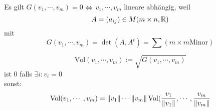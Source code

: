 \begin{Bem}
  Es gilt $G(v_1,\cdots,v_m)=0$ $\Leftrightarrow$ $v_1,\cdots,v_m$ lineare abhängig, weil
  \[A=(a_{ij})\in M(m\times n,\mathbb{R})\]
  mit
  \[G(v_1,\cdots,v_m)=\det (A,A^t)=\sum(m\times m \text{Minor})\]
\end{Bem}
\begin{Bem}
  \[\text{Vol}(v_1,\cdots,v_m):=\sqrt{G(v_1,\cdots,v_m)}\]
  ist 0 falls $\exists i:v_i=0$\\
  sonst:
  \[\text{Vol}(v_1,\cdots,v_m)=\left\| v_1 \right\|\cdots\left\| v_m \right\|\text{Vol}(\frac{v_1}{\left\| v_1 \right\|},\cdots,\frac{v_m}{\left\| v_m \right\|}\]
\end{Bem}
